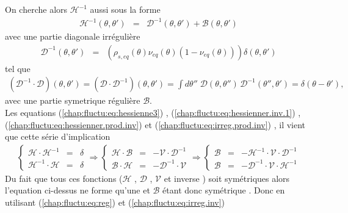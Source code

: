  On cherche alors \( \mathcal{H}^{-1} \) aussi sous la forme 
\begin{eqnarray}
	\mathcal{H}^{-1}(\theta, \theta') & = & \mathcal{D}^{-1}(\theta, \theta') + \mathcal{B}(\theta, \theta') 
	\label{chap:fluctu:eq:hessienner.inv.1}	
\end{eqnarray}
avec une partie diagonale irrégulière
\begin{eqnarray}
	\mathcal{D}^{-1}(\theta, \theta') & = & (\rho_{\! s , eq}(\theta)  \nu_{\! eq}(\theta)(1 -\nu_{\! eq}(\theta)))  \delta(\theta, \theta') 
	 \label{chap:fluctu:eq:irreg.inv}	
\end{eqnarray}
tel que 
\begin{eqnarray}
    (\mathcal{D}^{-1} \cdot  \mathcal{D})(\theta, \theta')  = (\mathcal{D}\cdot  \mathcal{D}^{-1})(\theta, \theta') =  \int d\theta'' \; \mathcal{D}(\theta, \theta'') \, \mathcal{D}^{-1}(\theta'', \theta') = \delta(\theta - \theta'),
    \label{chap:fluctu:eq:irreg.prod.inv}
\end{eqnarray}
avec une partie symetrique régulière $\mathcal{B}$.\\
Les equations (\ref{chap:fluctu:eq:hessienne3}) , (\ref{chap:fluctu:eq:hessienner.inv.1}) , (\ref{chap:fluctu:eq:hessienner.prod.inv}) et (\ref{chap:fluctu:eq:irreg.prod.inv}) , il vient que cette série d'implication
\begin{eqnarray}
	\left \{\begin{array}{rcl} \mathcal{H}\cdot\mathcal{H}^{-1} & =& \delta \\  \mathcal{H}^{-1}\cdot\mathcal{H} & =& \delta  \end{array} \right.  \Rightarrow	 \left \{\begin{array}{rcl} \mathcal{H}\cdot\mathcal{B} & =& - \mathcal{V}\cdot\mathcal{D}^{-1} \\  \mathcal{B}\cdot\mathcal{H} & =& - \mathcal{D}^{-1}\cdot\mathcal{V}  \end{array} \right. \Rightarrow \left \{\begin{array}{rcl} \mathcal{B} & =& - \mathcal{H}^{-1}\cdot\mathcal{V}\cdot \mathcal{D}^{-1}  \\  \mathcal{B} & =& - \mathcal{D}^{-1}\cdot\mathcal{V}\cdot \mathcal{H}^{-1}  \end{array} \right.	
\end{eqnarray}
Du fait que tous ces fonctions ($\mathcal{H}$ , $\mathcal{D}$ , $\mathcal{V}$ et inverse ) soit symétriques alors l'equation ci-dessus ne forme qu'une et $\mathcal{B}$ étant donc symétrique .
Donc en utilisant (\ref{chap:fluctu:eq:reg}) et (\ref{chap:fluctu:eq:irreg.inv}) 
